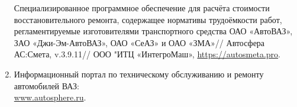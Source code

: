 \begin{enumerate}
{Специализированное программное обеспечение для расчёта стоимости  восстановительного ремонта, содержащее нормативы трудоёмкости работ, регламентируемые изготовителями транспортного средства ОАО «АвтоВАЗ», ЗАО «Джи-Эм-АвтоВАЗ», ОАО «СеАЗ» и ОАО «ЗМА»}//   Автосфера АС:Смета, v.3.9.11// ООО "ИТЦ «ИнтегроМаш», \url{https://autosmeta.pro}.
%
%
%
\item Информационный портал по техническому обслуживанию и ремонту автомобилей	 ВАЗ:\\ \url{www.autosphere.ru}.

\end{enumerate}
